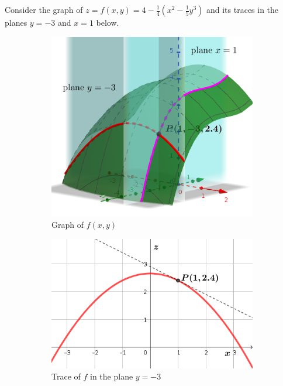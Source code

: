 \documentclass[13pt,letterpaper,fleqn]{article}
\begin{document}
Consider the graph of $z = f(x,y) = 4 - \frac{1}{4}\left(x^2 - \frac{1}{5}y^3\right)$ and its traces in the planes $y = -3$ and $x = 1$ below.
\begin{figure}[ht!]
 \centering
 \begin{subfigure}[t]{0.33\textwidth}
  \centering
  \includegraphics[width=0.8\linewidth]{img/Surface.png}
  \caption{Graph of $f(x,y)$}
  \label{f}
 \end{subfigure}
 \begin{subfigure}[t]{0.33\textwidth}
  \centering
  \includegraphics[width=0.8\linewidth]{img/parabola_trace.png}
  \caption{Trace of $f$ in the plane $y=-3$}
  \label{fx}
 \end{subfigure}
 \begin{subfigure}[t]{0.33\textwidth}
  \centering

\end{subfigure}
\end{figure}
\end{document}
